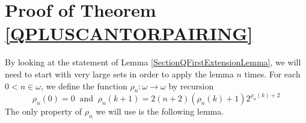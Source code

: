 \documentclass[10pt,a4paper, openany,  oldfontcommands]{memoir}
\newtheorem{open problem} [theorem] {Open Problem}
\newtheorem{open question} [theorem] {Open Question}
\begin{document}
\section{Proof of Theorem \ref{QPLUSCANTORPAIRING}}




By   looking at the statement of  Lemma  \ref{SectionQFirstExtensionLemma}, 
we will need to start  with very large sets in order to apply the lemma  $n$  times. 
For each  $ 0 <   n  \in  \omega $,  we define the function  $  \rho_n  :   \omega  \to  \omega $  by recursion  
\[
\rho_n (0) =   0
\     \mbox{  and  }       \    
\rho_n (k+1)  =  2  ( n +2)      \left(   \rho_n ( k ) +1       \right)     2^{   \rho_n ( k ) +2}   
\]
The only property of  $  \rho_n $  we will use is the following lemma. 
\end{document}
